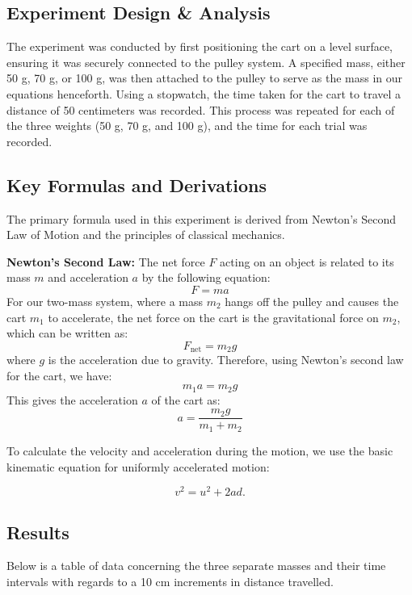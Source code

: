 ﻿\documentclass[reprint,amsmath,amssymb,aps]{revtex4-2}
\begin{document}
\subsection{Experiment Design \& Analysis}
The experiment was conducted by first positioning the cart on a level surface, ensuring it was securely connected to the pulley system. A specified mass, either 50 g, 70 g, or 100 g, was then attached to the pulley to serve as the mass in our equations henceforth. Using a stopwatch, the time taken for the cart to travel a distance of 50 centimeters was recorded. This process was repeated for each of the three weights (50 g, 70 g, and 100 g), and the time for each trial was recorded.

\subsection{Key Formulas and Derivations}
The primary formula used in this experiment is derived from Newton's Second Law of Motion and the principles of classical mechanics. 

\textbf{Newton's Second Law:}
The net force \( F \) acting on an object is related to its mass \( m \) and acceleration \( a \) by the following equation:
\[
F = ma
\]
For our two-mass system, where a mass \( m_2 \) hangs off the pulley and causes the cart \( m_1 \) to accelerate, the net force on the cart is the gravitational force on \( m_2 \), which can be written as:
\[
F_{\text{net}} = m_2 g
\]
where \( g \) is the acceleration due to gravity. Therefore, using Newton's second law for the cart, we have:
\[
m_1 a = m_2 g
\]
This gives the acceleration \( a \) of the cart as:
\[
a = \frac{m_2 g}{m_1 + m_2}
\]


To calculate the velocity and acceleration during the motion, we use the basic kinematic equation for uniformly accelerated motion:

\[
v^2 = u^2 + 2 a d. 
\]





\subsection{Results}
Below is a table of data concerning the three separate masses and their time intervals with regards to a 10 cm increments in distance travelled.
\end{document}
